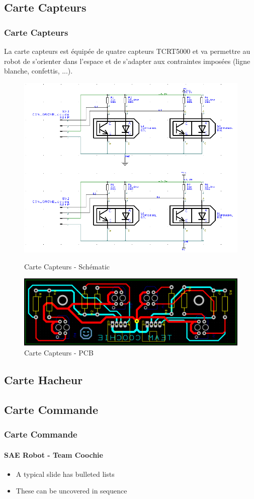 \subsection{Carte Capteurs}
\begin{frame}
    \frametitle{Carte Capteurs}
    La carte capteurs est équipée de quatre capteurs TCRT5000 et va permettre au robot de s'orienter dans l'espace et de s'adapter aux contraintes imposées (ligne blanche, confettis, ...).

    \vfill
    \begin{figure}[H]
        \centering
        \begin{minipage}{.5\textwidth}
            \centering
            \includegraphics[width=.7\linewidth]{Images/carteCapteurs_sch.png}
            \caption{Carte Capteurs - Schématic}
            \label{fig:ihmsch}
        \end{minipage}%
        \begin{minipage}{.5\textwidth}
            \centering
            \includegraphics[width=.5\linewidth]{Images/carteCapteurs_pcb.png}
            \caption{Carte Capteurs - PCB}
        \label{fig:ihmpcb}
        \end{minipage}
    \end{figure}
\end{frame}

\subsection{Carte Hacheur}

\subsection{Carte Commande}
    \begin{frame}
    \frametitle{Carte Commande}
    \framesubtitle{SAE Robot - Team Coochie}
    \begin{itemize}
        \item A typical slide has bulleted lists
        \item These can be uncovered in sequence
    \end{itemize}
\end{frame}